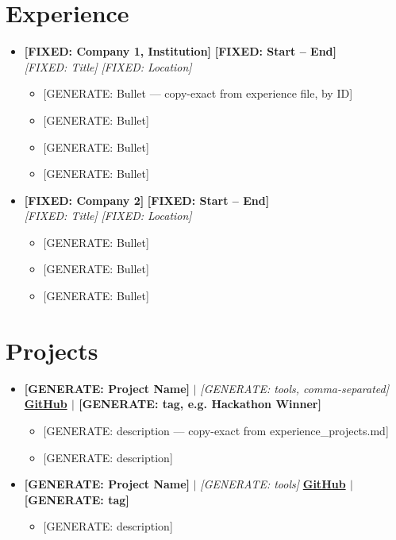 \documentclass[letterpaper,10pt]{article}
\newcommand{\resumeItem}[1]{\item \small{#1}}
\newcommand{\resumeSubheading}[4]{
\item
\textbf{#1} \hfill \textbf{\small #2} \\
\textit{\small #3} \hfill \textit{\small #4}
\vspace{-4pt}
}
\newcommand{\resumeProjectHeading}[2]{
\item
\small #1 \hfill \textbf{\small #2}
\vspace{-4pt}
}
\begin{document}
\section{Experience}
\begin{itemize}[leftmargin=0in, label={}]

\resumeSubheading
{[FIXED: Company 1, Institution]}{[FIXED: Start -- End]}
{[FIXED: Title]}{[FIXED: Location]}
\vspace{2pt}
\begin{itemize}
    \resumeItem{[GENERATE: Bullet — copy-exact from experience file, by ID]}
    \resumeItem{[GENERATE: Bullet]}
    \resumeItem{[GENERATE: Bullet]}
    \resumeItem{[GENERATE: Bullet]}
\end{itemize}

\resumeSubheading
{[FIXED: Company 2]}{[FIXED: Start -- End]}
{[FIXED: Title]}{[FIXED: Location]}
\begin{itemize}
\vspace{2pt}
  \resumeItem{[GENERATE: Bullet]}
  \resumeItem{[GENERATE: Bullet]}
  \resumeItem{[GENERATE: Bullet]}
\end{itemize}

\end{itemize}

\vspace{-12pt}
\section{Projects}
\begin{itemize}[leftmargin=0in, label={}]

\resumeProjectHeading
{\textbf{[GENERATE: Project Name]} $|$ \emph{[GENERATE: tools, comma-separated]}}{\href{[GENERATE: repo URL]}{GitHub} $|$ [GENERATE: tag, e.g. Hackathon Winner]}
\begin{itemize}
\vspace{2pt}
  \resumeItem{[GENERATE: description — copy-exact from experience_projects.md]}
  \resumeItem{[GENERATE: description]}
\end{itemize}

\resumeProjectHeading
{\textbf{[GENERATE: Project Name]} $|$ \emph{[GENERATE: tools]}}{\href{[GENERATE: repo URL]}{GitHub} $|$ [GENERATE: tag]}
\begin{itemize}
\vspace{2pt}
  \resumeItem{[GENERATE: description]}
\end{itemize}

\end{itemize}
\end{document}
